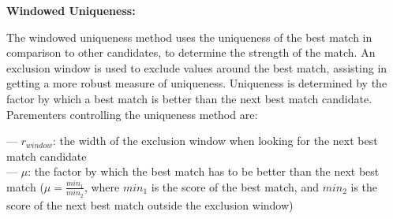 \parbox{\textwidth}{\textbf{Windowed Uniqueness:}} \smallskip
\parbox{\textwidth}{The windowed uniqueness method uses the uniqueness of the best match in comparison to other candidates, to determine the strength of the match. An exclusion window is used to exclude values around the best match, assisting in getting a more robust measure of uniqueness. Uniqueness is determined by the factor by which a best match is better than the next best match candidate. Parementers controlling the uniqueness method are:}
\parbox{\textwidth}{--- $r_{window}$: the width of the exclusion window when looking for the next best match candidate \\ --- $\mu$: the factor by which the best match has to be better than the next best match ($\mu=\frac{min_1}{min_2}$, where $min_1$ is the score of the best match, and $min_2$ is the score of the next best match outside the exclusion window)}
\smallskip
